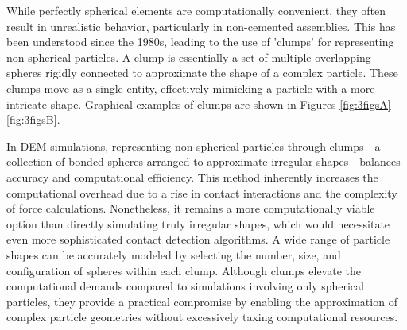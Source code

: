 While perfectly spherical elements are computationally convenient, they often result in unrealistic behavior, particularly in non-cemented assemblies. This has been understood since the 1980s, leading to the use of 'clumps' for representing non-spherical particles. A clump is essentially a set of multiple overlapping spheres rigidly connected to approximate the shape of a complex particle. These clumps move as a single entity, effectively mimicking a particle with a more intricate shape. Graphical examples of clumps are shown in Figures \ref{fig:3figsA} \ref{fig:3figsB}.

In DEM simulations, representing non-spherical particles through clumps—a collection of bonded spheres arranged to approximate irregular shapes—balances accuracy and computational efficiency. This method inherently increases the computational overhead due to a rise in contact interactions and the complexity of force calculations. Nonetheless, it remains a more computationally viable option than directly simulating truly irregular shapes, which would necessitate even more sophisticated contact detection algorithms. A wide range of particle shapes can be accurately modeled by selecting the number, size, and configuration of spheres within each clump. Although clumps elevate the computational demands compared to simulations involving only spherical particles, they provide a practical compromise by enabling the approximation of complex particle geometries without excessively taxing computational resources.
